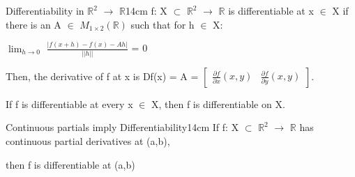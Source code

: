     \vspace{0.5cm}



    \begin{definition}{Differentiability in $\mathbb{R}^2$
    $\rightarrow$ $\mathbb{R}$}{14cm}
        f: X $\subset$ $\mathbb{R}^2$ $\rightarrow$ $\mathbb{R}$
        is {\color{lblue} differentiable} at x $\in$ X if there is an
        A $\in$ $M_{1 \times 2}(\mathbb{R})$ such that for h $\in$ X:

        \hspace{0.5cm}
        $\lim_{h \rightarrow 0}$ $\frac{|f(x+h)-f(x)-Ah|}{||h||}$ = 0

        Then, the {\color{lblue} derivative} of f at x is Df(x) = A =
        $
        \begin{bmatrix}
            \frac{\partial f}{\partial x}(x,y)
            & \frac{\partial f}{\partial y}(x,y)
        \end{bmatrix}
        $.

        If f is differentiable at every x $\in$ X, then f is differentiable on X.
    \end{definition}

    \vspace{0.5cm}



    \begin{wtheorem}{Continuous partials imply Differentiability}{14cm}
        If f: X $\subset$ $\mathbb{R}^2$ $\rightarrow$ $\mathbb{R}$
        has continuous partial derivatives at (a,b),

        then f is differentiable at (a,b)
    \end{wtheorem}

